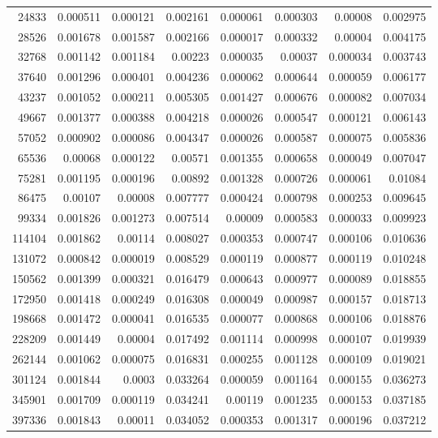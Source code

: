 \begin{longtable}{r r r r r r r r}
24833 & 0.000511 & 0.000121 & 0.002161 & 0.000061 & 0.000303 & 0.00008 & 0.002975 \\
28526 & 0.001678 & 0.001587 & 0.002166 & 0.000017 & 0.000332 & 0.00004 & 0.004175 \\
32768 & 0.001142 & 0.001184 & 0.00223 & 0.000035 & 0.00037 & 0.000034 & 0.003743 \\
37640 & 0.001296 & 0.000401 & 0.004236 & 0.000062 & 0.000644 & 0.000059 & 0.006177 \\
43237 & 0.001052 & 0.000211 & 0.005305 & 0.001427 & 0.000676 & 0.000082 & 0.007034 \\
49667 & 0.001377 & 0.000388 & 0.004218 & 0.000026 & 0.000547 & 0.000121 & 0.006143 \\
57052 & 0.000902 & 0.000086 & 0.004347 & 0.000026 & 0.000587 & 0.000075 & 0.005836 \\
65536 & 0.00068 & 0.000122 & 0.00571 & 0.001355 & 0.000658 & 0.000049 & 0.007047 \\
75281 & 0.001195 & 0.000196 & 0.00892 & 0.001328 & 0.000726 & 0.000061 & 0.01084 \\
86475 & 0.00107 & 0.00008 & 0.007777 & 0.000424 & 0.000798 & 0.000253 & 0.009645 \\
99334 & 0.001826 & 0.001273 & 0.007514 & 0.00009 & 0.000583 & 0.000033 & 0.009923 \\
114104 & 0.001862 & 0.00114 & 0.008027 & 0.000353 & 0.000747 & 0.000106 & 0.010636 \\
131072 & 0.000842 & 0.000019 & 0.008529 & 0.000119 & 0.000877 & 0.000119 & 0.010248 \\
150562 & 0.001399 & 0.000321 & 0.016479 & 0.000643 & 0.000977 & 0.000089 & 0.018855 \\
172950 & 0.001418 & 0.000249 & 0.016308 & 0.000049 & 0.000987 & 0.000157 & 0.018713 \\
198668 & 0.001472 & 0.000041 & 0.016535 & 0.000077 & 0.000868 & 0.000106 & 0.018876 \\
228209 & 0.001449 & 0.00004 & 0.017492 & 0.001114 & 0.000998 & 0.000107 & 0.019939 \\
262144 & 0.001062 & 0.000075 & 0.016831 & 0.000255 & 0.001128 & 0.000109 & 0.019021 \\
301124 & 0.001844 & 0.0003 & 0.033264 & 0.000059 & 0.001164 & 0.000155 & 0.036273 \\
345901 & 0.001709 & 0.000119 & 0.034241 & 0.00119 & 0.001235 & 0.000153 & 0.037185 \\
397336 & 0.001843 & 0.00011 & 0.034052 & 0.000353 & 0.001317 & 0.000196 & 0.037212 \\

\end{longtable}
